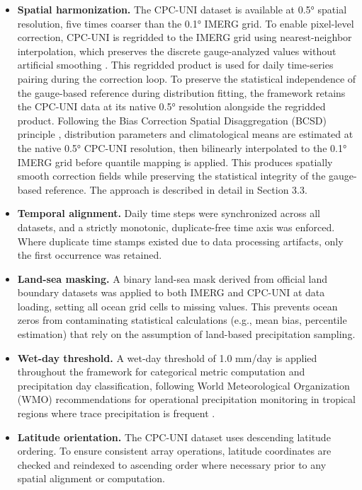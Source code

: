 \documentclass[
]{article}
\begin{document}
\begin{itemize}
\item
  \textbf{Spatial harmonization.} The CPC-UNI dataset is available at
  0.5° spatial resolution, five times coarser than the 0.1° IMERG grid.
  To enable pixel-level correction, CPC-UNI is regridded to the IMERG
  grid using nearest-neighbor interpolation, which preserves the
  discrete gauge-analyzed values without artificial smoothing \cite{ref13}.
  This regridded product is used for daily time-series pairing during
  the correction loop. To preserve the statistical independence of the
  gauge-based reference during distribution fitting, the framework
  retains the CPC-UNI data at its native 0.5° resolution alongside the
  regridded product. Following the Bias Correction Spatial
  Disaggregation (BCSD) principle \cite{ref23}, distribution parameters and
  climatological means are estimated at the native 0.5° CPC-UNI
  resolution, then bilinearly interpolated to the 0.1° IMERG grid before
  quantile mapping is applied. This produces spatially smooth correction
  fields while preserving the statistical integrity of the gauge-based
  reference. The approach is described in detail in Section 3.3.
\item
  \textbf{Temporal alignment.} Daily time steps were synchronized across
  all datasets, and a strictly monotonic, duplicate-free time axis was
  enforced. Where duplicate time stamps existed due to data processing
  artifacts, only the first occurrence was retained.
\item
  \textbf{Land-sea masking.} A binary land-sea mask derived from
  official land boundary datasets was applied to both IMERG and CPC-UNI
  at data loading, setting all ocean grid cells to missing values. This
  prevents ocean zeros from contaminating statistical calculations
  (e.g., mean bias, percentile estimation) that rely on the assumption
  of land-based precipitation sampling.
\item
  \textbf{Wet-day threshold.} A wet-day threshold of 1.0 mm/day is
  applied throughout the framework for categorical metric computation
  and precipitation day classification, following World Meteorological
  Organization (WMO) recommendations for operational precipitation
  monitoring in tropical regions where trace precipitation is frequent
  \cite{ref24}.
\item
  \textbf{Latitude orientation.} The CPC-UNI dataset uses descending
  latitude ordering. To ensure consistent array operations, latitude
  coordinates are checked and reindexed to ascending order where
  necessary prior to any spatial alignment or computation.
\end{itemize}
\end{document}
